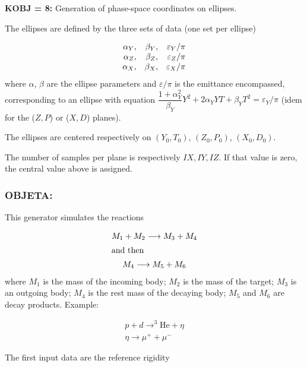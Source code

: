 \noindent\textbf{KOBJ = 8:} Generation of phase-space coordinates on ellipses. 

\noindent The ellipses are defined by  the three sets of data (one set per 
  ellipse) 

$$
\begin{array}{*{2}{r<{,}}r}
 \alpha_ Y  &   \beta_ Y  
            &  \varepsilon_Y / \pi \\
\alpha_ Z   &  \beta_ Z  
            &  \varepsilon_Z / \pi \\
\alpha_ X   & \beta_ X 
            &  \varepsilon_X / \pi 
\end{array}           
$$            
%
where $\alpha$, $\beta$ are the ellipse parameters and $\varepsilon/ 
\pi$ is the emittance encompassed, corresponding to an ellipse with equation 
$\dfrac{1 + \alpha^2_Y}{\beta_Y} Y^2 + 2 \alpha_Y YT + \beta_Y T^2 = 
\varepsilon_Y / \pi$ (idem for the ($Z, P$) or ($X, D$) planes). 

\noindent The ellipses are centered respectively on $(Y_0, T_0)$, $(Z_0, P_0)$, $(X_0, D_0)$.  

\noindent The number of samples per plane is respectively $IX, IY, IZ$.  If that value is zero, 
the central value above is assigned. 
 

\newpage


\subsubsection*{OBJETA:   \OBJETATitl\ \protect\cite{Biblio9}}  %
 \label{OBJETA} 
 
This generator simulates the reactions 

\begin{gather*}
     M_1+M_2 \longrightarrow  M_3+M_4  \\
\intertext{and then} 
     M_4 \longrightarrow  M_5 + M_6 
\end{gather*}
%
where  $ M_1 $ is the mass of the incoming body; $ M_2 $ is the mass
of the target;  $ M_3 $ is an outgoing body;  $ M_4 $ is the rest mass of the
decaying body; $ M_5 $ and $ M_6 $ are decay products. Example: 

  \begin{gather*}
	  p+d \longrightarrow^3 \text{He}  + \eta  \\
	 \eta  \longrightarrow  \mu^ ++ \mu^-
  \end{gather*}
   
\noindent The first input data are the reference rigidity 

